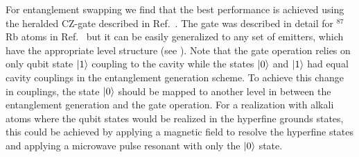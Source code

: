 For entanglement swapping we find that the best performance is achieved using
the heralded CZ-gate described in Ref.~\cite{Borregaard2015a}. The gate was described
in detail for ${}^{87}$Rb atoms in Ref.~\cite{Borregaard2015a} but it can be easily
generalized to any set of emitters, which have the appropriate level structure
(see ). Note that the gate operation relies on only qubit
state $| 1 \rangle$ coupling to the cavity while the states $| 0 \rangle$ and $| 1 \rangle$
had equal cavity couplings in the entanglement generation scheme. To achieve
this change in couplings, the state $| 0 \rangle$ should be mapped to another level
in between the entanglement generation and the gate operation. For a realization
with alkali atoms where the qubit states would be realized in the hyperfine
grounds states, this could be achieved by applying a magnetic field to resolve
the hyperfine states and applying a microwave pulse resonant with only the
$| 0 \rangle$ state.
